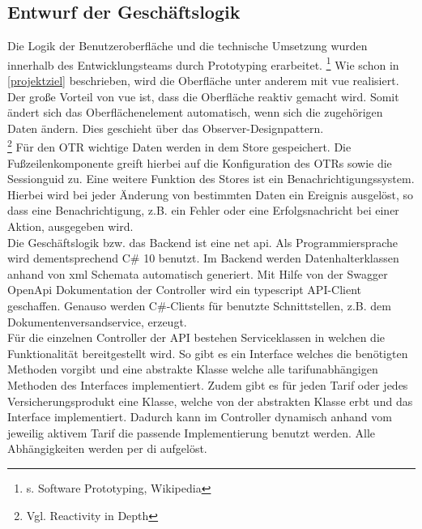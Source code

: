 \subsection{Entwurf der Geschäftslogik}
\label{geschaeftslogik}
Die Logik der Benutzeroberfläche und die technische Umsetzung wurden innerhalb des Entwicklungsteams durch Prototyping erarbeitet. \footnote{s.\cite{Prototyping2022} Software Prototyping, Wikipedia}
Wie schon in \ref{projektziel}  beschrieben, wird die Oberfläche unter anderem mit \gls{vue} realisiert. Der große Vorteil von \gls{vue} ist, dass die Oberfläche reaktiv gemacht wird. Somit ändert sich das Oberflächenelement automatisch, wenn sich die zugehörigen Daten ändern. Dies geschieht über das Observer-Designpattern.\\ \footnote{Vgl.\cite{ReactivityinDepth2022} Reactivity in Depth}
Für den \ac{OTR} wichtige Daten werden in dem Store gespeichert. Die Fußzeilenkomponente greift hierbei auf die Konfiguration des \ac{OTR}s sowie die Sessionguid zu.
Eine weitere Funktion des Stores ist ein Benachrichtigungssystem. Hierbei wird bei jeder Änderung von bestimmten Daten ein Ereignis ausgelöst, so dass eine Benachrichtigung, z.B. ein Fehler oder eine Erfolgsnachricht bei einer Aktion, ausgegeben wird.\\

Die Geschäftslogik bzw. das Backend ist eine \gls{net} \gls{api}. Als Programmiersprache wird dementsprechend C\# 10 benutzt.
Im Backend werden Datenhalterklassen anhand von \gls{xml} Schemata automatisch generiert. Mit Hilfe von der Swagger OpenApi Dokumentation der Controller wird ein \gls{typescript} API-Client geschaffen. Genauso werden C\#-Clients für benutzte Schnittstellen, z.B. dem Dokumentenversandservice, erzeugt.\\
Für die einzelnen Controller der API bestehen Serviceklassen in welchen die Funktionalität bereitgestellt wird. So gibt es ein Interface welches die benötigten Methoden vorgibt und eine abstrakte Klasse welche alle tarifunabhängigen Methoden des Interfaces implementiert. Zudem gibt es für jeden Tarif oder jedes Versicherungsprodukt eine Klasse, welche von der abstrakten Klasse erbt und das Interface implementiert. Dadurch kann im Controller dynamisch anhand vom jeweilig aktivem Tarif die passende Implementierung benutzt werden. %
Alle Abhängigkeiten werden per \gls{di} aufgelöst.
